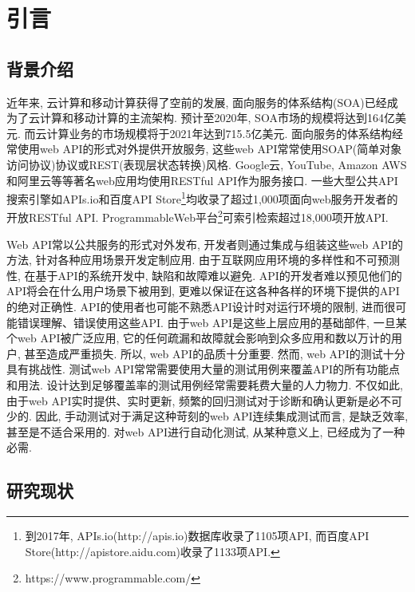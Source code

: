 \chapter{引言}

	\section{背景介绍}
    
        近年来, 云计算和移动计算获得了空前的发展, 面向服务的体系结构(SOA)已经成为了云计算和移动计算的主流架构\cite{wintergreen17}. 预计至2020年, SOA市场的规模将达到164亿美元. 而云计算业务的市场规模将于2021年达到715.5亿美元\cite{skyhighnetworks18azure}. 面向服务的体系结构经常使用web API的形式对外提供开放服务\cite{hamza15}, 这些web API常常使用SOAP(简单对象访问协议)协议或REST(表现层状态转换)风格\cite{fielding2000architectural}. Google云\cite{googlecloud17}, YouTube\cite{youtube17}, Amazon AWS\cite{amazonec217}和阿里云\cite{alibaba17}等等著名web应用均使用RESTful API作为服务接口. 一些大型公共API搜索引擎如APIs.io和百度API Store\footnote{到2017年, APIs.io(http://apis.io)数据库收录了1105项API, 而百度API Store(http://apistore.aidu.com)收录了1133项API.}均收录了超过1,000项面向web服务开发者的开放RESTful API. ProgrammableWeb平台\footnote{https://www.programmable.com/}可索引检索超过18,000项开放API.
        
        Web API常以公共服务的形式对外发布, 开发者则通过集成与组装这些web API的方法, 针对各种应用场景开发定制应用. 由于互联网应用环境的多样性和不可预测性, 在基于API的系统开发中, 缺陷和故障难以避免. API的开发者难以预见他们的API将会在什么用户场景下被用到, 更难以保证在这各种各样的环境下提供的API的绝对正确性. API的使用者也可能不熟悉API设计时对运行环境的限制, 进而很可能错误理解、错误使用这些API. 由于web API是这些上层应用的基础部件, 一旦某个web API被广泛应用, 它的任何疏漏和故障就会影响到众多应用和数以万计的用户, 甚至造成严重损失. 所以, web API的品质十分重要. 然而, web API的测试十分具有挑战性. 测试web API常常需要使用大量的测试用例来覆盖API的所有功能点和用法. 设计达到足够覆盖率的测试用例经常需要耗费大量的人力物力. 不仅如此, 由于web API实时提供、实时更新, 频繁的回归测试对于诊断和确认更新是必不可少的. 因此, 手动测试对于满足这种苛刻的web API连续集成测试而言, 是缺乏效率, 甚至是不适合采用的. 对web API进行自动化测试, 从某种意义上, 已经成为了一种必需.

	\section{研究现状}
	
